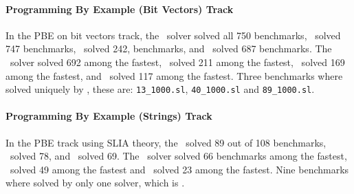 \paragraph{Programming By Example (Bit Vectors) Track}
In the PBE on bit vectors track, the \ethree\ solver solved all 750 benchmarks,
\euphony\ solved 747 benchmarks, \eusolvernew\ solved 242, benchmarks, and \cvcnew\ solved 687 benchmarks. The \ethree\ solver solved 692 among the fastest, \eusolvernew\ solved 211 among the fastest, \cvcnew\ solved 169 among the fastest, and \euphony\ solved 117 among the fastest. Three benchmarks where solved uniquely by \ethree, these are: \texttt{13_1000.sl}, \texttt{40_1000.sl} and \texttt{89_1000.sl}.

\paragraph{Programming By Example (Strings) Track}
In the PBE track using SLIA theory, the \cvcnew\ solved 89 out of 108 benchmarks, \euphony\ solved 78, and \eusolvernew\ solved 69. The \euphony\ solver solved 66 benchmarks among the fastest, \cvcnew\ solved 49 among the fastest and \eusolvernew\ solved 23 among the fastest. Nine benchmarks where solved by only one solver, which is \cvcnew.